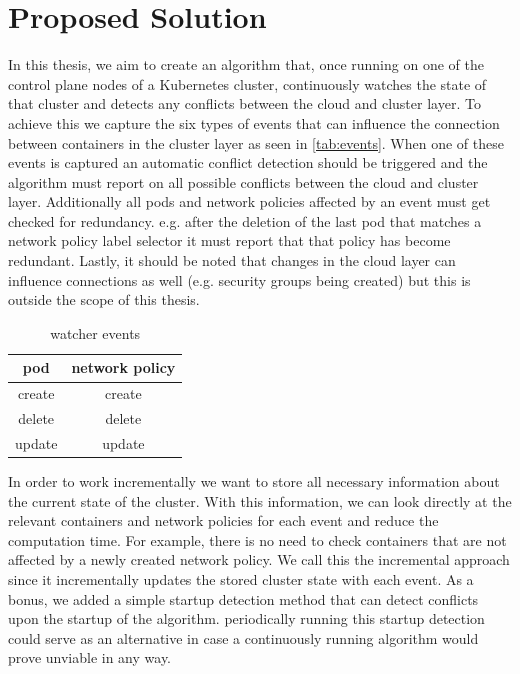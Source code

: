 \chapter{Proposed Solution}                                 \label{ch:solution}

In this thesis, we aim to create an algorithm that, once running on one of the control plane nodes of a Kubernetes cluster, continuously watches the state of that cluster and detects any conflicts between the cloud and cluster layer. To achieve this we capture the six types of events that can influence the connection between containers in the cluster layer as seen in \autoref{tab:events}. When one of these events is captured an automatic conflict detection should be triggered and the algorithm must report on all possible conflicts between the cloud and cluster layer. Additionally all pods and network policies affected by an event must get checked for redundancy. e.g. after the deletion of the last pod that matches a network policy label selector it must report that that policy has become redundant. Lastly, it should be noted that changes in the cloud layer can influence connections as well (e.g. security groups being created) but this is outside the scope of this thesis.
\\[10pt]
\begin{table}[htbp]
  \centering
  \begin{tabular}{|c|c|}
    \hline
    pod & network policy \\
    \hline
    create & create \\
    delete & delete \\
    update & update \\
    \hline
  \end{tabular}
  \caption{watcher events}
  \label{tab:events}

\end{table}

In order to work incrementally we want to store all necessary information about the current state of the cluster. With this information, we can look directly at the relevant containers and network policies for each event and reduce the computation time. For example, there is no need to check containers that are not affected by a newly created network policy. We call this the incremental approach since it incrementally updates the stored cluster state with each event. As a bonus, we added a simple startup detection method that can detect conflicts upon the startup of the algorithm. periodically running this startup detection could serve as an alternative in case a continuously running algorithm would prove unviable in any way.  
\\[10pt]

